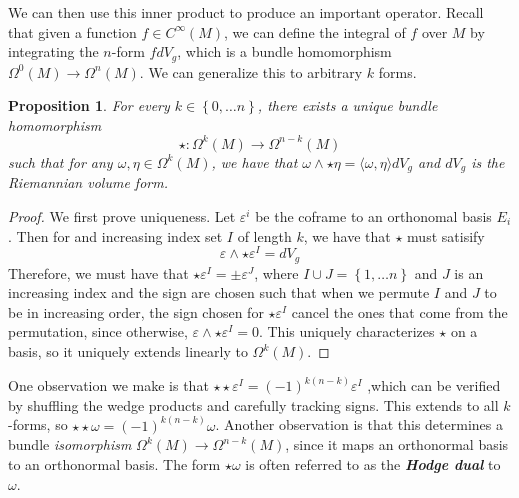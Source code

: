 \documentclass[psamsfonts]{amsart}
\newtheorem{prop}[thm]{Proposition}
\theoremstyle{definition}
\theoremstyle{remark}
\newcommand{\ib}[1]{\textbf{\textit{#1}}}
\newcommand{\set}[1]{\left\lbrace#1 \right\rbrace}
\begin{document}
We can then use this inner product to produce an important operator. Recall that given a function $f \in C^\infty(M)$, we can define the integral of $f$ over $M$ by integrating the $n$-form $fdV_g$, which is a bundle homomorphism $\Omega^0(M) \to \Omega^n(M)$. We can generalize this to arbitrary $k$ forms.
\begin{prop}
For every $k \in \set{0, \ldots  n}$, there exists a unique bundle homomorphism
$$\star: \Omega^{k}(M) \to \Omega^{n-k}(M)$$
such that for any $\omega, \eta  \in \Omega^k(M)$, we have that $\omega \wedge \star\eta = \langle \omega, \eta \rangle dV_g$ and $dV_g$ is the Riemannian volume form.
\end{prop}
\begin{proof}
We first prove uniqueness. Let $\varepsilon^i$  be the coframe to an orthonomal basis $E_i$. Then for and increasing index set $I$ of length $k$, we have that $\star$ must satisify 
$$\varepsilon \wedge \star \varepsilon^I = dV_g$$
Therefore, we must have that $\star \varepsilon^I = \pm \varepsilon^J$, where $I \cup J = \set{1, \ldots n}$ and $J$ is an increasing index and the sign are chosen such that when we permute $I$ and $J$ to be in increasing order, the sign chosen for $\star \varepsilon^I$ cancel the ones that come from the permutation, since otherwise, $\varepsilon \wedge \star \varepsilon^I = 0$. This uniquely characterizes $\star$ on a basis, so it uniquely extends linearly to $\Omega^k(M)$.
\end{proof}

One observation we make is that $\star\star \varepsilon^I = (-1)^{k(n-k)}\varepsilon^I$ ,which can be verified by shuffling the wedge products and carefully tracking signs. This extends to all $k$-forms, so $\star \star\omega = (-1)^{k(n-k)}\omega$. Another observation is that this determines a bundle \emph{isomorphism} $\Omega^k(M) \to \Omega^{n-k}(M)$, since it maps an orthonormal basis to an orthonormal basis. The form $\star \omega$ is often referred to as the \ib{Hodge dual} to $\omega$.
%
\end{document}
